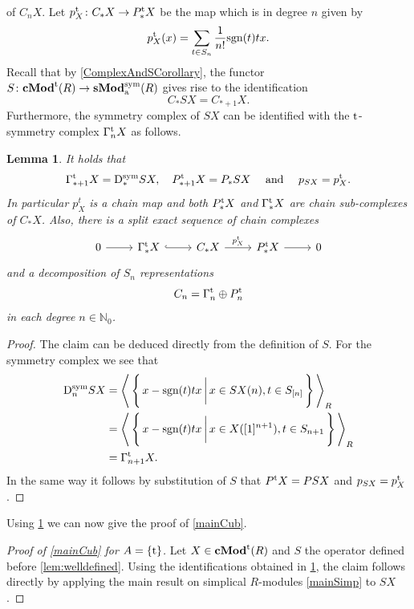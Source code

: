 \documentclass[12pt]{amsart}
\theoremstyle{plain}
\newtheorem{lemma}{Lemma}
\numberwithin{lemma}{\DefaultNumberTheoremWithin}
\numberwithin{claim}{\DefaultNumberTheoremWithin}
\numberwithin{theorem}{\DefaultNumberTheoremWithin}
\numberwithin{corollary}{\DefaultNumberTheoremWithin}
\numberwithin{proposition}{\DefaultNumberTheoremWithin}
\numberwithin{conjecture}{\DefaultNumberTheoremWithin}
\theoremstyle{definition}
\theoremstyle{definition}
\numberwithin{question}{\DefaultNumberTheoremWithin}
\theoremstyle{definition}
\numberwithin{problem}{\DefaultNumberTheoremWithin}
\theoremstyle{remark}
\numberwithin{remark}{\DefaultNumberTheoremWithin}
\theoremstyle{remark}
\numberwithin{example}{\DefaultNumberTheoremWithin}
\def\blt{*}
\def\one{[1]}
\def\sgn{\textnormal{sgn}}
\def\sym{\textnormal{sym}}
\def\trp{\textnormal{t}}
\def\Deg{\mathrm{D}}    %
\def\sDeg{\Deg^{\mathrm{sym}}}  %
\def\Con{\mathrm{\Gamma}}  %
\def\tCon{\Con^{\trp}}   %
\newcommand{\sMod}[2]{\mathbf{sMod}_\textnormal{a}^{\textnormal{#1}}(#2)}  %
\newcommand{\cMod}[2]{\mathbf{cMod}^{\textnormal{#1}}(#2)}  %
\newcommand{\Sym}[1]{S_{[#1]}}
\begin{document}
of $C_nX$. Let $p^{\trp}_X\colon C_\blt X\to P_{\blt}^{\trp}X$ be the map which is in degree $n$ given by
\begin{align*}
    p^{\trp}_X(x)=\sum_{t\in S_n}\frac{1}{n!} \sgn(t)t x.
\end{align*}
Recall that by \ref{ComplexAndSCorollary}, the functor $S\colon\cMod{\trp}{R} \to \sMod{\sym}{R}$ gives rise to the identification
\[
C_\blt SX= C_{\blt+1} X.
\]
Furthermore, the symmetry complex of $SX$ can be identified with the $\trp$-symmetry complex $\tCon_n X$ as follows.
\begin{lemma}\label{CubSimpIdent}
It holds that
\begin{align*}
    \tCon_{\blt+1} X=\sDeg_{\blt} SX,\quad P^{\trp}_{\blt+1} X=P_{\blt} SX\quad \text{ and }\quad p_{SX}=p^{\trp}_X.
\end{align*}
In particular $p_X^t$ is a chain map and both $P^{\trp}_{\blt}X$ and $\tCon_{\blt} X$ are chain sub-complexes of $C_\blt X$. Also, there is a split exact sequence of chain complexes  
\[
\begin{tikzcd}
    0\arrow{r}{}&\tCon_\blt X\arrow[hook]{r}{} &C_\blt X\arrow{r}{p^{\trp}_X}&P^{\trp}_\blt X \arrow{r}&0
\end{tikzcd}
    \] and a decomposition of $S_n$ representations
    \begin{align*}
C_n=\tCon_{n}\oplus P^{\trp}_n
\end{align*}
in each degree $n\in \mathbb{N}_0$.
\end{lemma}
\begin{proof}
The claim can be deduced directly from the definition of $S$. For the symmetry complex we see that
    \begin{align*}
        \sDeg_nSX&=\Bigg\langle\, \Bigg\{\, x -\sgn(t)tx \,\bigg\vert \,x\in SX(n),t\in \Sym{n}\,\Bigg\} \,\Bigg\rangle_R\\
        &=\Bigg\langle\, \Bigg\{\, x -\sgn(t) t x \,\bigg\vert\, x\in X(\one^{n+1}),t\in S_{n+1}\,\Bigg\}\, \Bigg\rangle_R\\
        &=\tCon_{n+1}X.
    \end{align*}
    In the same way it follows by substitution of $S$ that $P^{\trp}X=PSX $ and $p_{SX}=p^{\trp}_X$.
\end{proof}

Using \ref{CubSimpIdent} we can now give the proof
of \ref{mainCub}.

\begin{proof}[Proof of \ref{mainCub} for $A=\{\trp\}$]
        Let $X\in \cMod{\trp}{R}$ and
        $S$ the operator defined before \ref{lem:welldefined}. Using the identifications obtained in \ref{CubSimpIdent}, the claim follows directly by applying the main result on simplical $R$-modules \ref{mainSimp} to $SX$. 
\end{proof}
\end{document}
